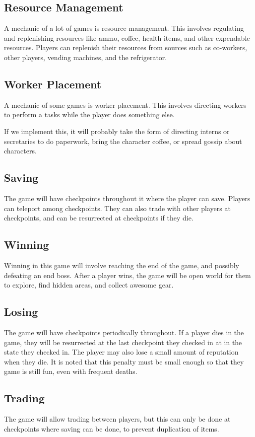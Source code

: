 \documentclass[14pt]{article}
\begin{document}
\subsection*{Resource Management}
A mechanic of a lot of games is resource management. 
This involves regulating and replenishing resources like 
ammo, coffee, health items, and other expendable resources. 
Players can replenish their resources from sources such as
co-workers, other players, vending machines, and the refrigerator. 

\subsection*{Worker Placement}
A mechanic of some games is worker placement. This involves
directing workers to perform a tasks while the player does 
something else. 

If we implement this, it will probably take the form of 
directing interns or secretaries to do paperwork, 
bring the character coffee, or spread gossip about characters. 

\subsection*{Saving}
The game will have checkpoints throughout it where the player can save. 
Players can teleport among checkpoints. They can also trade with other 
players at checkpoints, and can be resurrected at checkpoints if they die. 

\subsection*{Winning}
Winning in this game will involve reaching the end of the game, 
and possibly defeating an end boss. After a player wins, the 
game will be open world for them to explore, find hidden areas, 
and collect awesome gear. 

\subsection*{Losing}
The game will have checkpoints periodically throughout. If a player 
dies in the game, they will be resurrected at the last checkpoint they
checked in at in the state they checked in. The player may also lose
a small amount of reputation when they die. It is noted that this 
penalty must be small enough so that they game is still fun, even 
with frequent deaths. 

\subsection*{Trading}
The game will allow trading between players, but this can only be done
at checkpoints where saving can be done, to prevent duplication of items.
\end{document}
